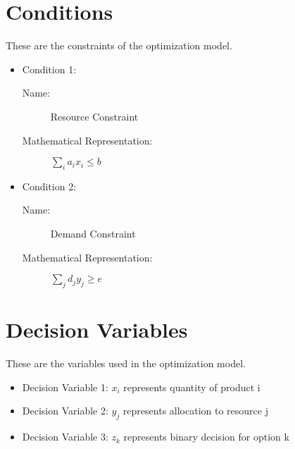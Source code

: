 \documentclass{article}
\begin{document}
\section{Conditions}
These are the constraints of the optimization model.
\begin{itemize}
    \item Condition 1:
        \begin{description}
            \item[Name:] Resource Constraint
            \item[Mathematical Representation:] $\sum_{i} a_i x_i \leq b$
        \end{description}
    \item Condition 2:
        \begin{description}
            \item[Name:] Demand Constraint
            \item[Mathematical Representation:] $\sum_{j} d_j y_j \geq e$
        \end{description}
\end{itemize}

\section{Decision Variables}
These are the variables used in the optimization model.
\begin{itemize}
    \item Decision Variable 1: $x_i$ represents quantity of product i
    \item Decision Variable 2: $y_j$ represents allocation to resource j
    \item Decision Variable 3: $z_k$ represents binary decision for option k
\end{itemize}
\end{document}
